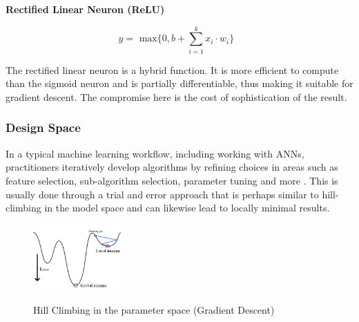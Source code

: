 \documentclass[a4paper,11pt,titlepage]{article}
\begin{document}
		\textbf{Rectified Linear Neuron (ReLU) }
		
		$$
		y = 
		\text{ max$\{0,  b + \sum\limits_{i=1}^k x_{i} \cdot w_{i}\}$ }	
		$$		
		
		The rectified linear neuron is a hybrid function. It is more efficient to compute than the sigmoid neuron and is partially differentiable, thus making it suitable for gradient descent. The compromise here is the cost of sophistication of the result.

\subsubsection{Design Space}
		In a typical machine learning workflow, including working with ANNs, practitioners iteratively develop algorithms by refining choices in areas such as feature selection, sub-algorithm selection, parameter tuning and more \cite{Patel2008}. This is usually done through a trial and error approach that is perhaps similar to hill-climbing in the model space and can likewise lead to locally minimal results.
						
		\begin{figure}[H]
    			\centering	
			{{\includegraphics[width=0.3\textwidth]
    				{img/gradient_descent.png} 
    			}}%
    			\caption{Hill Climbing in the parameter space (Gradient Descent)}%
    			\label{fig:GradDesc}
		\end{figure}	
		
\end{document}
